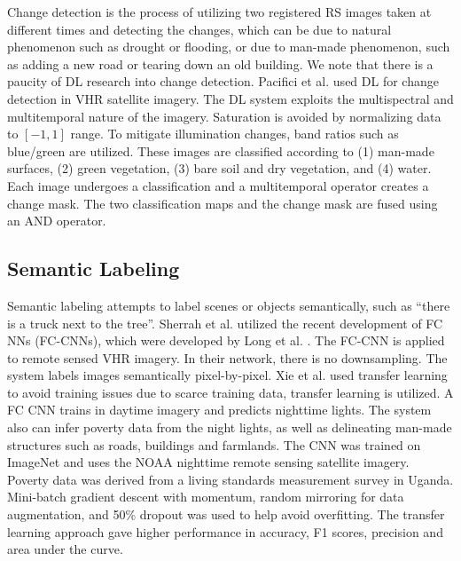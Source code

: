 \documentclass[12pt]{spieman}
\begin{document}
\begin{spacing}{1}
Change detection is the process of utilizing two registered RS images taken at different times and detecting the changes, which can be due to natural phenomenon such as drought or flooding, or due to man-made phenomenon, such as adding a new road or tearing down an old building. We note that there is a paucity of DL research into change detection. Pacifici et al. \cite{Pacifici2007} used DL for change detection in VHR satellite imagery. The DL system exploits the multispectral and multitemporal nature of the imagery. Saturation is avoided by normalizing data to $[-1,1]$ range. To mitigate illumination changes, band ratios such as blue/green are utilized. These images are classified according to (1) man-made surfaces, (2) green vegetation, (3) bare soil and dry vegetation, and (4) water. Each image undergoes a classification and a multitemporal operator creates a change mask. The two classification maps and the change mask are fused using an AND operator.

\subsection{Semantic Labeling}

Semantic labeling attempts to label scenes or objects semantically, such as ``there is a truck next to the tree''. Sherrah et al. \cite{sherrah2016fully} utilized the recent development of FC NNs (FC-CNNs), which were developed by Long et al. \cite{long2015fully}. The FC-CNN is applied to remote sensed VHR imagery. In their network, there is no downsampling. The system labels images semantically pixel-by-pixel. Xie et al. \cite{xie2015transfer} used transfer learning to avoid training issues due to scarce training data, transfer learning is utilized. A FC CNN trains in daytime imagery and predicts nighttime lights. The system also can infer poverty data from the night lights, as well as delineating man-made structures such as roads, buildings and farmlands. The CNN was trained on ImageNet and uses the NOAA nighttime remote sensing satellite imagery. Poverty data was derived from a living standards measurement survey in Uganda. Mini-batch gradient descent with momentum, random mirroring for data augmentation, and 50\% dropout was used to help avoid overfitting. The transfer learning approach gave higher performance in accuracy, F1 scores, precision and area under the curve. 


\end{spacing}
\end{document}
